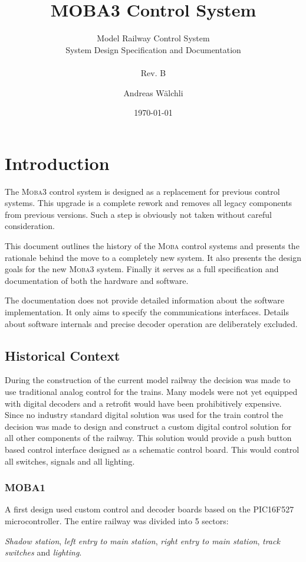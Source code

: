 \documentclass{scrreprt}
\title{MOBA3 Control System}
\subtitle{
Model Railway Control System\\
System Design Specification and Documentation\\\ \\
Rev. B}
\author{Andreas Wälchli}
\date{\today}
\begin{document}
\maketitle

\tableofcontents

\chapter{Introduction}
The \textsc{Moba3} control system is designed as a replacement for previous control systems.
This upgrade is a complete rework and removes all legacy components from previous versions.
Such a step is obviously not taken without careful consideration.

This document outlines the history of the \textsc{Moba} control systems and presents the rationale behind the move to a completely new system.
It also presents the design goals for the new \textsc{Moba3} system.
Finally it serves as a full specification and documentation of both the hardware and software.

The documentation does not provide detailed information about the software implementation.
It only aims to specify the communications interfaces.
Details about software internals and precise decoder operation are deliberately excluded.

\section{Historical Context}
During the construction of the current model railway the decision was made to use traditional analog control for the trains.
Many models were not yet equipped with digital decoders and a retrofit would have been prohibitively expensive.
Since no industry standard digital solution was used for the train control the decision was made to design and construct a custom digital control solution for all other components of the railway.
This solution would provide a push button based control interface designed as a schematic control board.
This would control all switches, signals and all lighting.

\subsection{MOBA1}
A first design used custom control and decoder boards based on the PIC16F527 microcontroller.
The entire railway was divided into 5 sectors:

\emph{Shadow station}, \emph{left entry to main station}, \emph{right entry to main station}, \emph{track switches} and \emph{lighting}.
\end{document}
